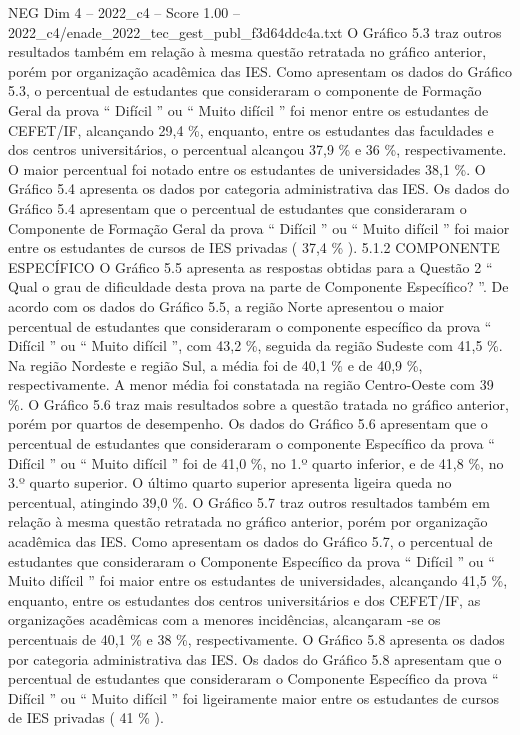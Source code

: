 \begin{textsample}{NEG Dim 4 – 2022\_c4 – Score 1.00 – 2022\_c4/enade\_2022\_tec\_gest\_publ\_f3d64ddc4a.txt}
O Gráfico 5.3 traz outros resultados também em relação à mesma questão retratada no gráfico anterior, porém por organização acadêmica das IES.
Como apresentam os dados do Gráfico 5.3, o percentual de estudantes que consideraram o componente de Formação Geral da prova “ Difícil ” ou “ Muito difícil ” foi menor entre os estudantes de CEFET/IF, alcançando 29,4 \%, enquanto, entre os estudantes das faculdades e dos centros universitários, o percentual alcançou 37,9 \% e 36 \%, respectivamente.
O maior percentual foi notado entre os estudantes de universidades 38,1 \%.
O Gráfico 5.4 apresenta os dados por categoria administrativa das IES.
Os dados do Gráfico 5.4 apresentam que o percentual de estudantes que consideraram o Componente de Formação Geral da prova “ Difícil ” ou “ Muito difícil ” foi maior entre os estudantes de cursos de IES privadas ( 37,4 \% ). 5.1.2 COMPONENTE ESPECÍFICO O Gráfico 5.5 apresenta as respostas obtidas para a Questão 2 “ Qual o grau de dificuldade desta prova na parte de Componente Específico? ”.
De acordo com os dados do Gráfico 5.5, a região Norte apresentou o maior percentual de estudantes que consideraram o componente específico da prova “ Difícil ” ou “ Muito difícil ”, com 43,2 \%, seguida da região Sudeste com 41,5 \%.
Na região Nordeste e região Sul, a média foi de 40,1 \% e de 40,9 \%, respectivamente.
A menor média foi constatada na região Centro-Oeste com 39 \%.
O Gráfico 5.6 traz mais resultados sobre a questão tratada no gráfico anterior, porém por quartos de desempenho.
Os dados do Gráfico 5.6 apresentam que o percentual de estudantes que consideraram o componente Específico da prova “ Difícil ” ou “ Muito difícil ” foi de 41,0 \%, no 1.º quarto inferior, e de 41,8 \%, no 3.º quarto superior.
O último quarto superior apresenta ligeira queda no percentual, atingindo 39,0 \%.
O Gráfico 5.7 traz outros resultados também em relação à mesma questão retratada no gráfico anterior, porém por organização acadêmica das IES.
Como apresentam os dados do Gráfico 5.7, o percentual de estudantes que consideraram o Componente Específico da prova “ Difícil ” ou “ Muito difícil ” foi maior entre os estudantes de universidades, alcançando 41,5 \%, enquanto, entre os estudantes dos centros universitários e dos CEFET/IF, as organizações acadêmicas com a menores incidências, alcançaram -se os percentuais de 40,1 \% e 38 \%, respectivamente.
O Gráfico 5.8 apresenta os dados por categoria administrativa das IES.
Os dados do Gráfico 5.8 apresentam que o percentual de estudantes que consideraram o Componente Específico da prova “ Difícil ” ou “ Muito difícil ” foi ligeiramente maior entre os estudantes de cursos de IES privadas ( 41 \% ).

\end{textsample}
